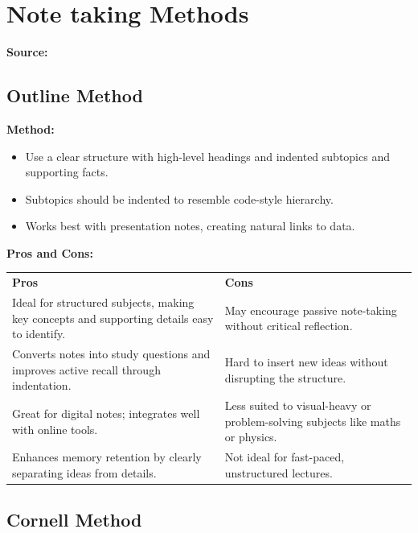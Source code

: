 \section{Note taking Methods}
\label{research:NotetakingMethods}
\textbf{Source:} \cite{jesperSubjectGuidesNotetaking}

\subsection*{Outline Method}

\textbf{Method:}
\begin{itemize}
    \item Use a clear structure with high-level headings and indented subtopics and supporting facts.
    \item Subtopics should be indented to resemble code-style hierarchy.
    \item Works best with presentation notes, creating natural links to data.
\end{itemize}

\textbf{Pros and Cons:}

\begin{tabularx}{\textwidth}{>{\raggedright\arraybackslash}X>{\raggedright\arraybackslash}X}
    \rowcolor{gray!15} \textbf{Pros}                                                            & \textbf{Cons}                                                                  \\
    Ideal for structured subjects, making key concepts and supporting details easy to identify. & May encourage passive note-taking without critical reflection.                 \\
    Converts notes into study questions and improves active recall through indentation.         & Hard to insert new ideas without disrupting the structure.                     \\
    Great for digital notes; integrates well with online tools.                                 & Less suited to visual-heavy or problem-solving subjects like maths or physics. \\
    Enhances memory retention by clearly separating ideas from details.                         & Not ideal for fast-paced, unstructured lectures.                               \\
\end{tabularx}

\vspace{1em}
\subsection*{Cornell Method}

